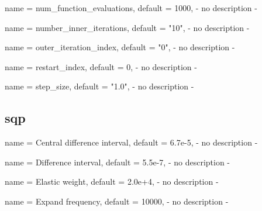 \begin{parameter}{
    name    = {num_function_evaluations},
    default = {1000},
}
- no description -
\end{parameter}

\begin{parameter}{
    name    = {number_inner_iterations},
    default = {"10"},
}
- no description -
\end{parameter}

\begin{parameter}{
    name    = {outer_iteration_index},
    default = {"0"},
}
- no description -
\end{parameter}

\begin{parameter}{
    name    = {restart_index},
    default = {0},
}
- no description -
\end{parameter}

\begin{parameter}{
    name    = {step_size},
    default = {"1.0"},
}
- no description -
\end{parameter}

\subsection{sqp}

\begin{parameter}{
    name    = {Central difference interval},
    default = {6.7e-5},
}
- no description -
\end{parameter}

\begin{parameter}{
    name    = {Difference interval},
    default = {5.5e-7},
}
- no description -
\end{parameter}

\begin{parameter}{
    name    = {Elastic weight},
    default = {2.0e+4},
}
- no description -
\end{parameter}

\begin{parameter}{
    name    = {Expand frequency},
    default = {10000},
}
- no description -
\end{parameter}

